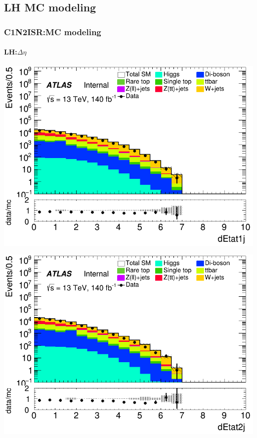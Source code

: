\documentclass[usenames,dvipsnames]{beamer}
\begin{document}
\subsection{LH MC modeling}
\begin{frame}
\frametitle{C1N2ISR:MC modeling}
\framesubtitle{LH:\quad $\Delta\eta$}
    \begin{minipage}{0.32\textwidth}
        \centering
        \includegraphics[width=\textwidth]{graphics/LH_met/LH_met_dEtat1j.png}
    \end{minipage}
    \hfill
    \begin{minipage}{0.32\textwidth}
        \centering
        \includegraphics[width=\textwidth]{graphics/LH_met/LH_met_dEtat2j.png}
    \end{minipage}
    \hfill

\end{frame}
\end{document}
